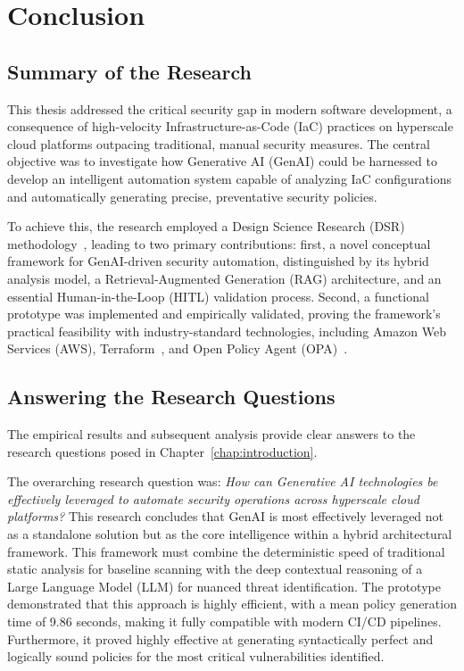 
\chapter{Conclusion} %
\label{chap:conclusion} %

\section{Summary of the Research}

This thesis addressed the critical security gap in modern software development, a consequence of high-velocity Infrastructure-as-Code (IaC) practices on hyperscale cloud platforms outpacing traditional, manual security measures. The central objective was to investigate how Generative AI (GenAI) could be harnessed to develop an intelligent automation system capable of analyzing IaC configurations and automatically generating precise, preventative security policies.

To achieve this, the research employed a Design Science Research (DSR) methodology~\cite{hevner_design_2004}, leading to two primary contributions: first, a novel conceptual framework for GenAI-driven security automation, distinguished by its hybrid analysis model, a Retrieval-Augmented Generation (RAG) architecture, and an essential Human-in-the-Loop (HITL) validation process. Second, a functional prototype was implemented and empirically validated, proving the framework's practical feasibility with industry-standard technologies, including Amazon Web Services (AWS), Terraform~\cite{howard_terraform_2022}, and Open Policy Agent (OPA)~\cite{the_opa_authors_open_2025}.

\section{Answering the Research Questions}

The empirical results and subsequent analysis provide clear answers to the research questions posed in Chapter~\ref{chap:introduction}.

The overarching research question was: \textit{How can Generative AI technologies be effectively leveraged to automate security operations across hyperscale cloud platforms?}
This research concludes that GenAI is most effectively leveraged not as a standalone solution but as the core intelligence within a hybrid architectural framework. This framework must combine the deterministic speed of traditional static analysis for baseline scanning with the deep contextual reasoning of a Large Language Model (LLM) for nuanced threat identification. The prototype demonstrated that this approach is highly efficient, with a mean policy generation time of 9.86 seconds, making it fully compatible with modern CI/CD pipelines. Furthermore, it proved highly effective at generating syntactically perfect and logically sound policies for the most critical vulnerabilities identified.

